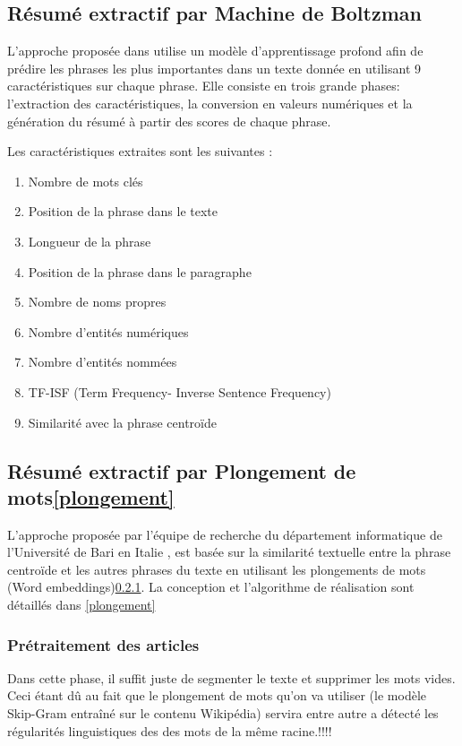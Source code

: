     \subsection{Résumé extractif par Machine de Boltzman}
    L'approche proposée dans \cite{boltzman} utilise un modèle d'apprentissage profond afin de prédire les phrases les plus importantes dans un texte donnée en utilisant 9 caractéristiques sur chaque phrase. Elle consiste en trois grande phases: l'extraction des caractéristiques, la conversion en valeurs numériques et la génération du résumé à partir des scores de chaque phrase. 

    Les caractéristiques extraites sont les suivantes :
    \begin{enumerate}
        \item{Nombre de mots clés}
        \item{Position de la phrase dans le texte}
        \item{Longueur de la phrase}
        \item{Position de la phrase dans le paragraphe}
        \item{Nombre de noms propres}
        \item{Nombre d'entités numériques}
        \item{Nombre d'entités nommées}
        \item{TF-ISF (Term Frequency- Inverse Sentence Frequency)}
        \item{Similarité avec la phrase centroïde}
    \end{enumerate} 

    \subsection{Résumé extractif par Plongement de mots\ref{plongement}}
    L'approche proposée par l'équipe de recherche du département informatique de l'Université de Bari en Italie \cite{bari}, est basée sur la similarité textuelle entre la phrase centroïde et les autres phrases du texte en utilisant les plongements de mots (Word embeddings)\ref{}. La conception et l'algorithme de réalisation sont détaillés dans \ref{plongement}

        \subsubsection{Prétraitement des articles}
        Dans cette phase, il suffit juste de segmenter le texte et supprimer les mots vides. Ceci étant dû au fait que le plongement de mots qu'on va utiliser (le modèle Skip-Gram entraîné sur le contenu Wikipédia) servira entre autre a détecté les régularités linguistiques des des mots de la même racine.!!!!


